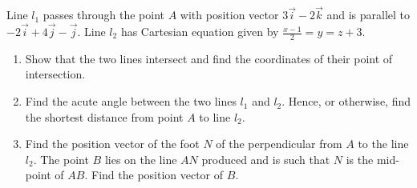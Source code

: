 \begin{problem}
    Line $l_1$ passes through the point $A$ with position vector $3\vec i - 2\vec k$ and is parallel to $-2\vec i + 4\vec j - \vec j$. Line $l_2$ has Cartesian equation given by $\frac{x-1}2 = y = z + 3$.

    \begin{enumerate}
        \item Show that the two lines intersect and find the coordinates of their point of intersection.
        \item Find the acute angle between the two lines $l_1$ and $l_2$. Hence, or otherwise, find the shortest distance from point $A$ to line $l_2$.
        \item Find the position vector of the foot $N$ of the perpendicular from $A$ to the line $l_2$. The point $B$ lies on the line $AN$ produced and is such that $N$ is the mid-point of $AB$. Find the position vector of $B$.
    \end{enumerate}
\end{problem}
